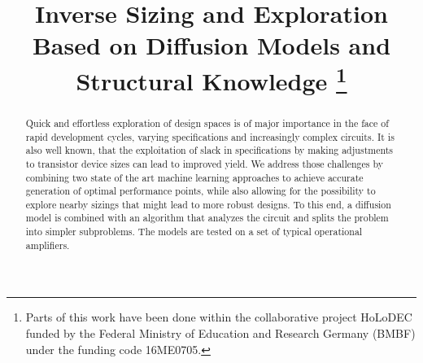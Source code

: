 \documentclass[conference]{IEEEtran}
\begin{document}

\title{Inverse Sizing and Exploration Based on Diffusion Models and Structural Knowledge
\thanks{Parts of this work have been done within the collaborative project HoLoDEC funded by the Federal Ministry of Education and Research Germany (BMBF) under the funding code 16ME0705.}}



\maketitle

\begin{abstract}
Quick and effortless exploration of design spaces is of major importance in the face of rapid development cycles, varying specifications and increasingly complex circuits.
It is also well known, that the exploitation of slack in specifications by making adjustments to transistor device sizes can lead to improved yield.
We address those challenges by combining two state of the art machine learning approaches to achieve accurate generation of optimal performance points, while also allowing for the possibility to explore nearby sizings that might lead to more robust designs. To this end, a diffusion model is combined with an algorithm that analyzes the circuit and splits the problem into simpler subproblems. The models are tested on a set of typical operational amplifiers.
\end{abstract}

\end{document}
